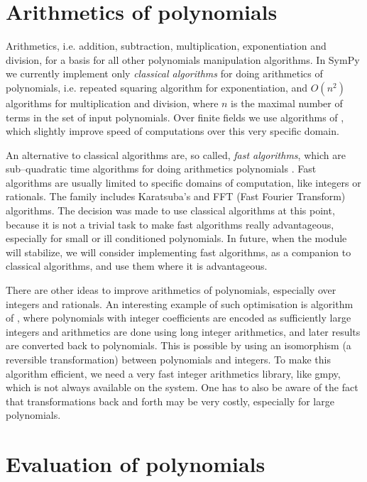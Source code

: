 \section{Arithmetics of polynomials}

Arithmetics, i.e. addition, subtraction, multiplication, exponentiation and division, for a basis
for all other polynomials manipulation algorithms. In SymPy we currently implement only \emph{classical
algorithms} for doing arithmetics of polynomials, i.e. repeated squaring algorithm for exponentiation,
and $O(n^2)$ algorithms for multiplication and division, where $n$ is the maximal number of terms in
the set of input polynomials. Over finite fields we use algorithms of \cite{Monagan1993inplace}, which
slightly improve speed of computations over this very specific domain.

An alternative to classical algorithms are, so called, \emph{fast algorithms}, which are sub--quadratic
time algorithms for doing arithmetics polynomials \cite{Moenck1976practical}. Fast algorithms are usually
limited to specific domains of computation, like integers or rationals. The family includes Karatsuba's
and FFT (Fast Fourier Transform) algorithms. The decision was made to use classical algorithms at this
point, because it is not a trivial task to make fast algorithms really advantageous, especially for
small or ill conditioned polynomials. In future, when the module will stabilize, we will consider
implementing fast algorithms, as a companion to classical algorithms, and use them where it is
advantageous.

There are other ideas to improve arithmetics of polynomials, especially over integers and rationals.
An interesting example of such optimisation is algorithm of \cite{Fateman2005encoding}, where polynomials
with integer coefficients are encoded as sufficiently large integers and arithmetics are done using
long integer arithmetics, and later results are converted back to polynomials. This is possible by
using an isomorphism (a reversible transformation) between polynomials and integers. To make this
algorithm efficient, we need a very fast integer arithmetics library, like gmpy, which is not always
available on the system. One has to also be aware of the fact that transformations back and forth
may be very costly, especially for large polynomials.


\section{Evaluation of polynomials}

